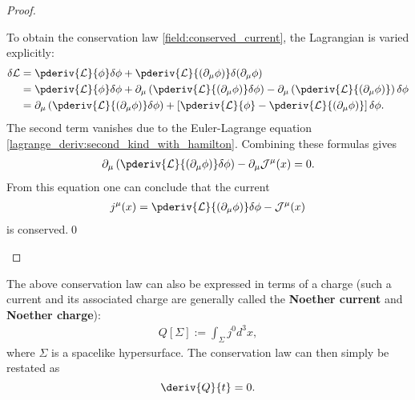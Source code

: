 \begin{theorem}
\begin{proof}
\begin{mdframed}[roundcorner=10pt, linecolor=blue, linewidth=1pt]
                To obtain the conservation law \eqref{field:conserved_current}, the Lagrangian is varied explicitly:
                \begin{align*}
                    \delta\mathcal{L} &= \pderiv{\mathcal{L}}{\phi}\delta\phi + \pderiv{\mathcal{L}}{(\partial_\mu\phi)}\delta(\partial_\mu\phi)\\
                    &= \pderiv{\mathcal{L}}{\phi}\delta\phi + \partial_\mu\left(\pderiv{\mathcal{L}}{(\partial_\mu\phi)}\delta\phi\right) - \partial_\mu\left(\pderiv{\mathcal{L}}{(\partial_\mu\phi)}\right)\delta\phi\\
                    &= \partial_\mu\left(\pderiv{\mathcal{L}}{(\partial_\mu\phi)}\delta\phi\right) + \left[\pderiv{\mathcal{L}}{\phi} - \pderiv{\mathcal{L}}{(\partial_\mu\phi)}\right]\delta\phi.
                \end{align*}
                The second term vanishes due to the Euler-Lagrange equation \eqref{lagrange_deriv:second_kind_with_hamilton}. Combining these formulas gives
                \begin{gather}
                    \partial_\mu\left(\pderiv{\mathcal{L}}{(\partial_\mu\phi)}\delta\phi\right) - \partial_\mu\mathcal{J}^\mu(x) = 0.
                \end{gather}
                From this equation one can conclude that the current
                \begin{gather}
                    j^\mu(x) = \pderiv{\mathcal{L}}{(\partial_\mu\phi)}\delta\phi - \mathcal{J}^\mu(x)
                \end{gather}
                is conserved.\qed
            \end{mdframed}
        \end{proof}
    \end{theorem}
    The above conservation law can also be expressed in terms of a charge (such a current and its associated charge are generally called the \textbf{Noether current} and \textbf{Noether charge}):
    \begin{gather}
        \label{field:noether_charge}
        Q[\Sigma] := \int_\Sigma j^0d^3x,
    \end{gather}
    where $\Sigma$ is a spacelike hypersurface. The conservation law can then simply be restated as \[\deriv{Q}{t} = 0.\]


